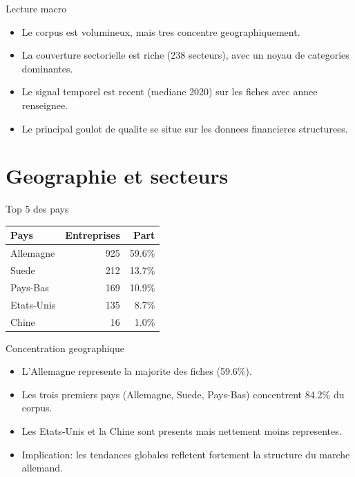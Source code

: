 \documentclass[aspectratio=169]{beamer}
\begin{document}
\begin{frame}{Lecture macro}
\begin{itemize}
  \item Le corpus est volumineux, mais tres concentre geographiquement.
  \item La couverture sectorielle est riche (238 secteurs), avec un noyau de categories dominantes.
  \item Le signal temporel est recent (mediane 2020) sur les fiches avec annee renseignee.
  \item Le principal goulot de qualite se situe sur les donnees financieres structurees.
\end{itemize}
\end{frame}

\section{Geographie et secteurs}

\begin{frame}{Top 5 des pays}
\begin{table}
\centering
\begin{tabular}{lrr}
\toprule
Pays & Entreprises & Part \\
\midrule
Allemagne & 925 & 59.6\% \\
Suede & 212 & 13.7\% \\
Pays-Bas & 169 & 10.9\% \\
Etats-Unis & 135 & 8.7\% \\
Chine & 16 & 1.0\% \\
\bottomrule
\end{tabular}
\end{table}
\end{frame}

\begin{frame}{Concentration geographique}
\begin{itemize}
  \item L'Allemagne represente la majorite des fiches (59.6\%).
  \item Les trois premiers pays (Allemagne, Suede, Pays-Bas) concentrent 84.2\% du corpus.
  \item Les Etats-Unis et la Chine sont presents mais nettement moins representes.
  \item Implication: les tendances globales refletent fortement la structure du marche allemand.
\end{itemize}
\end{frame}
\end{document}
